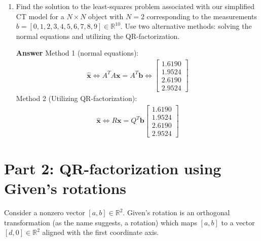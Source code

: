 \documentclass[10pt,a4paper]{article}
\theoremstyle{plain}
\theoremstyle{definition}
\begin{document}
\begin{enumerate}
  \item Find the solution to the least-squares problem associated with our simplified CT model for a \(N\times N\) object with \(N=2\) corresponding to the measurements \(b = [0,1,2,3,4,5,6,7,8,9]\in \mathbb{R}^{10}\).
  Use two alternative methods: solving the normal equations and utilizing the QR-factorization.
  \item[\textbf{Answer}] 
  Method 1 (normal equations):
  \begin{align*}
    \mathbf{\hat{x}} \Longleftrightarrow A^TA\mathbf{x}=A^T\mathbf{b} \Longleftrightarrow
    \begin{bmatrix}
      1.6190 \\ 1.9524 \\ 2.6190 \\ 2.9524
    \end{bmatrix}
  \end{align*}
  Method 2 (Utilizing QR-factorization):
  \begin{align*}
    \mathbf{\hat{x}} \Longleftrightarrow R\mathbf{x}=Q^T\mathbf{b}\begin{bmatrix}
      1.6190 \\ 1.9524 \\ 2.6190 \\ 2.9524
    \end{bmatrix}
  \end{align*}
\end{enumerate}

\section*{Part 2: QR-factorization using Given's rotations}

Consider a nonzero vector \([a,b] \in \mathbb{R}^2\).
Given's rotation is an orthogonal transformation (as the name suggests, a rotation) which maps \([a,b]\) to a vector \([d,0]\in \mathbb{R}^2\)
aligned with the first coordinate axis.
\end{document}

